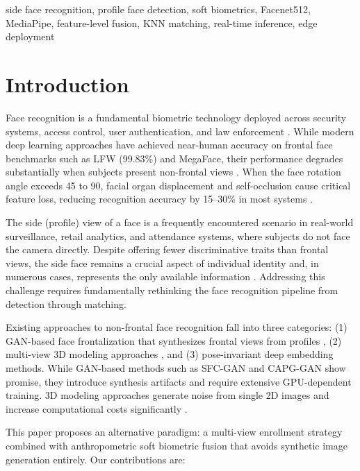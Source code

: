 \documentclass[conference]{IEEEtran}
\begin{document}
\begin{IEEEkeywords}
side face recognition, profile face detection, soft biometrics, Facenet512, MediaPipe, feature-level fusion, KNN matching, real-time inference, edge deployment
\end{IEEEkeywords}

\section{Introduction}

Face recognition is a fundamental biometric technology deployed across security systems, access control, user authentication, and law enforcement \cite{b1}. While modern deep learning approaches have achieved near-human accuracy on frontal face benchmarks such as LFW (99.83\%) and MegaFace, their performance degrades substantially when subjects present non-frontal views \cite{b2}. When the face rotation angle exceeds 45\textdegree{} to 90\textdegree{}, facial organ displacement and self-occlusion cause critical feature loss, reducing recognition accuracy by 15--30\% in most systems \cite{b3}.

The side (profile) view of a face is a frequently encountered scenario in real-world surveillance, retail analytics, and attendance systems, where subjects do not face the camera directly. Despite offering fewer discriminative traits than frontal views, the side face remains a crucial aspect of individual identity and, in numerous cases, represents the only available information \cite{b4}. Addressing this challenge requires fundamentally rethinking the face recognition pipeline from detection through matching.

Existing approaches to non-frontal face recognition fall into three categories: (1) GAN-based face frontalization that synthesizes frontal views from profiles \cite{b3}, (2) multi-view 3D modeling approaches \cite{b5}, and (3) pose-invariant deep embedding methods. While GAN-based methods such as SFC-GAN \cite{b3} and CAPG-GAN \cite{b6} show promise, they introduce synthesis artifacts and require extensive GPU-dependent training. 3D modeling approaches generate noise from single 2D images and increase computational costs significantly \cite{b5}.

This paper proposes an alternative paradigm: a multi-view enrollment strategy combined with anthropometric soft biometric fusion that avoids synthetic image generation entirely. Our contributions are:
\end{document}
